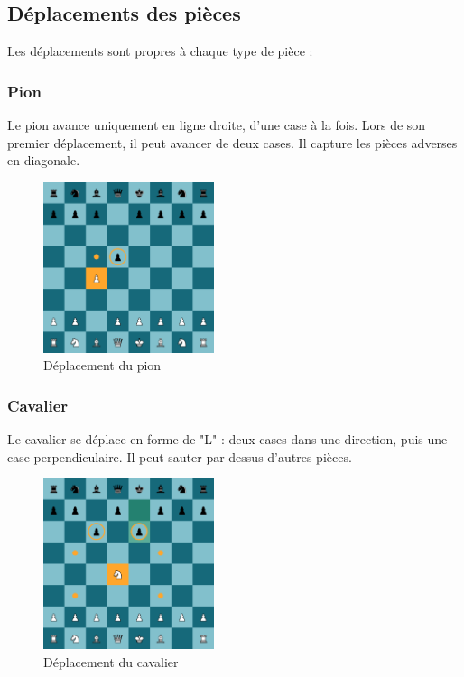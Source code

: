 \documentclass{article}
\begin{document}
\subsection{Déplacements des pièces}

Les déplacements sont propres à chaque type de pièce :

\subsubsection*{Pion}
Le pion avance uniquement en ligne droite, d'une case à la fois. Lors de son premier déplacement, il peut avancer de deux cases. Il capture les pièces adverses en diagonale.

\begin{figure}[h]
    \centering
    \includegraphics[width=\textwidth,height=5.0cm,keepaspectratio]{pionMove.png}
    \caption{Déplacement du pion}
\end{figure}

\subsubsection*{Cavalier}
Le cavalier se déplace en forme de "L" : deux cases dans une direction, puis une case perpendiculaire. Il peut sauter par-dessus d'autres pièces.

\begin{figure}[h]
    \centering
    \includegraphics[width=\textwidth,height=5.0cm,keepaspectratio]{cavalierMove.png}
    \caption{Déplacement du cavalier}
\end{figure}
\end{document}
